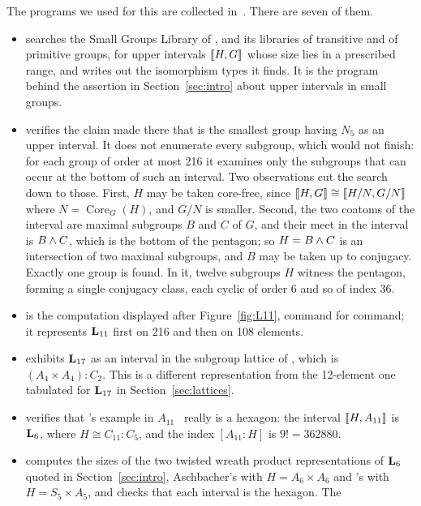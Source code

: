 {The \gap programs we used for this are collected in~\cite{finlatrepgap}.
There are seven of them.
\begin{itemize}
\item
{} searches the Small Groups Library of \gap,
and its libraries of transitive and of primitive groups, for upper intervals
$\llbracket H, G\rrbracket$ whose size lies in a prescribed range, and writes out the
isomorphism types it finds.  It is the program behind the assertion in
Section~\ref{sec:intro} about upper intervals in small groups.
\item
{} verifies the claim made there that
 is the smallest group having $N_5$ as an
upper interval.  It does not enumerate every subgroup, which would not
finish: for each group of order at most 216 it examines only the
subgroups that can occur at the bottom of such an interval.  Two
observations cut the search down to those.  First, $H$ may be taken
core-free, since $\llbracket H, G\rrbracket \cong \llbracket H/N, G/N\rrbracket$ where
$N = \operatorname{Core}_G(H)$, and $G/N$ is smaller.  Second, the two
coatoms of the interval are maximal subgroups $B$ and $C$ of $G$, and
their meet in the interval is $B \wedge C$, which is the bottom of the
pentagon; so $H = B \wedge C$ is an intersection of two maximal
subgroups, and $B$ may be taken up to conjugacy.  Exactly one group is
found.  In it, twelve subgroups $H$ witness the pentagon, forming a
single conjugacy class, each cyclic of order 6 and so of index 36.
\item
{} is the computation displayed after Figure~\ref{fig:L11},
command for command; it represents $\mathbf{L}_{11}$ first on 216 and then on
108 elements.
\item
{} exhibits $\mathbf{L}_{17}$ as an interval in the subgroup lattice
of , which is $(A_4 \times A_4) : C_2$.  This is
a different representation from the 12-element one tabulated for $\mathbf{L}_{17}$
in Section~\ref{sec:lattices}.
\item
{} verifies that \Palfy's example in $A_{11}$~\cite{Palfy1988}
really is a hexagon: the interval $\llbracket H, A_{11}\rrbracket$ is $\mathbf{L}_6$, where
$H \cong C_{11} : C_5$, and the index $[A_{11}:H]$ is $9! = 362880$.
\item
{} computes the sizes of the two twisted wreath
product representations of $\mathbf{L}_6$ quoted in Section~\ref{sec:intro},
Aschbacher's with $H = A_6 \times A_6$ and \Palfy's with
$H = S_5 \times A_5$, and checks that each interval is the hexagon.  The

\end{itemize}}
